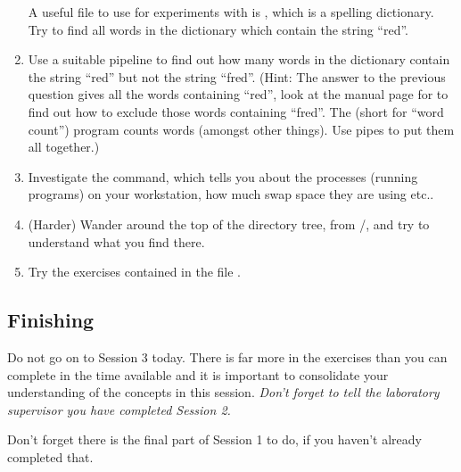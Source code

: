 \begin{enumerate}
A useful file to use for experiments with  is
, which is a spelling dictionary. Try to
find all words 
in the dictionary which contain the string ``red''.
\item 
  Use a suitable pipeline to find out how many
  words in the dictionary contain the string ``red'' but not the
  string ``fred''.  (Hint: The answer to the previous question gives all
  the words containing ``red'', look at the manual page for
   to find out how to exclude those words containing
  ``fred''. The  (short for ``word count'') program counts words
  (amongst other things). Use pipes to put them all together.)
\item Investigate the  command, which tells you about the
  processes (running programs) on your workstation, how much swap
  space they are using etc..
\item (Harder) Wander around the top of the directory tree, from /,
  and try to understand what you find there.
\item Try the exercises contained in the file .
\end{enumerate}

\subsection{Finishing}
Do not go on to Session 3 today. There is far more in the exercises
than you can complete in the time available and it is important to
consolidate your understanding of the concepts in this session. \emph{Don't
forget to tell the laboratory supervisor you have completed Session 2.}

Don't forget there is the final part of Session 1 to do, if you haven't
already completed that.

\cleardoublepage

